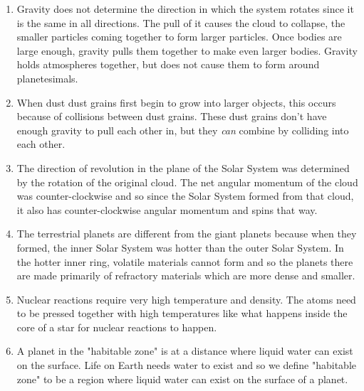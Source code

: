 \documentclass[../hw2.tex]{subfiles}
\begin{document}

    \begin{enumerate}
        \item {} Gravity does not determine the direction in which the system rotates since it is the same in all directions. The pull of it causes the cloud to collapse, the smaller particles coming together to form larger particles. Once bodies are large enough, gravity pulls them together to make even larger bodies. Gravity holds atmospheres together, but does not cause them to form around planetesimals.
        \item {} When dust dust grains first begin to grow into larger objects, this occurs because of collisions between dust grains. These dust grains don't have enough gravity to pull each other in, but they \emph{can} combine by colliding into each other.
        \item {} The direction of revolution in the plane of the Solar System was determined by the rotation of the original cloud. The net angular momentum of the cloud was counter-clockwise and so since the Solar System formed from that cloud, it also has counter-clockwise angular momentum and spins that way.
        \item {} The terrestrial planets are different from the giant planets because when they formed, the inner Solar System was hotter than the outer Solar System. In the hotter inner ring, volatile materials cannot form and so the planets there are made primarily of refractory materials which are more dense and smaller. 
        \item {} Nuclear reactions require very high temperature and density. The atoms need to be pressed together with high temperatures like what happens inside the core of a star for nuclear reactions to happen.
        \item {} A planet in the "habitable zone" is at a distance where liquid water can exist on the surface. Life on Earth needs water to exist and so we define "habitable zone" to be a region where liquid water can exist on the surface of a planet.
    \end{enumerate}
    
\end{document}
